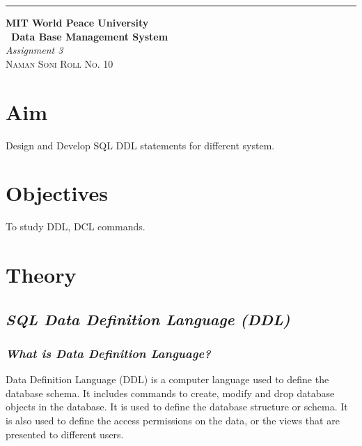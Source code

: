 \documentclass{article}
\begin{document}
\begin{titlepage} %
		
		\raggedleft\rule{1pt}{\textheight} %
		\hspace{0.05\textwidth} %
		\parbox[b]{0.75\textwidth}
		{ %
			
			{\Huge\bfseries MIT World Peace University \\[0.5\baselineskip] \ Data Base Management System}\\[2\baselineskip] %
			{\large\textit{Assignment 3}}\\[4\baselineskip] %
			{\Large\textsc{Naman Soni Roll No. 10}} %
			
			\vspace{0.5\textheight} %
		}
		
\end{titlepage}
\tableofcontents
\pagebreak
\section{\textbf{Aim}}
Design and Develop SQL DDL statements for different system.

\section{\textbf{Objectives}}
To study DDL, DCL commands.

\section{\textbf{Theory}}
\subsection{\textit{SQL Data Definition Language (DDL)}}
\subsubsection{\textit{What is Data Definition Language?}}
Data Definition Language (DDL) is a computer language used to define the database schema. It includes commands to create, modify and drop database objects in the database.
It is used to define the database structure or schema. It is also used to define the access permissions on the data, or the views that are presented to different users.
\end{document}
